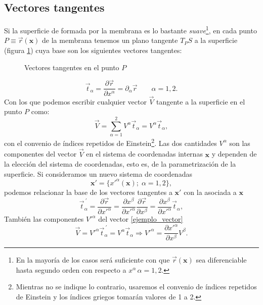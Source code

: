 \subsection{Vectores tangentes}

Si la superficie de formada por la membrana es lo bastante
\textit{suave}\footnote{En la mayoría de los casos será suficiente con que
 $\vec{r}(\mathbf{x})$ sea diferenciable hasta segundo orden con respecto a
 $x^{\alpha}\, \alpha=1,2$.}, en cada punto $P\equiv\vec{r}(\mathbf{x})$ de la
membrana tenemos un plano tangente $T_PS$ a la superficie (figura
\ref{vectores_tang-fig}) cuya base son los siguientes vectores tangentes:
\begin{figure}[h]
\centering
 
\caption{Vectores tangentes en el punto $P$}\label{vectores_tang-fig}
\end{figure}

\begin{equation*}
\vec{t}_{\alpha}=\frac{\partial \vec{r}}{\partial
  x^{\alpha}}=\partial_{\alpha}\vec{r} \qquad \alpha=1,2.
\end{equation*}
Con los que podemos escribir cualquier vector $\vec{V}$ tangente a la superficie en el punto $P$ como:
\begin{equation}\label{ejemplo_vector} 
  \vec{V}=\sum^2_{\alpha=1}V^{\alpha}\vec{t}_{\alpha}=V^{\alpha}\vec{t}_{\alpha},
\end{equation}
con el convenio de índices repetidos de Einstein\footnote{Mientras no se
  indique lo contrario, usaremos el convenio de índices repetidos de
  Einstein y los índices griegos tomarán valores de 1 a 2.}. Las dos cantidades
$V^{\alpha}$ son las componentes del vector $\vec{V}$ en el sistema de
coordenadas internas $\mathbf{x}$ y dependen de la elección del sistema de
coordenadas, esto es, de la parametrización de la superficie. Si consideramos
un nuevo sistema de coordenadas  
\begin{equation*}
 \mathbf{x}'=\{x'^{\alpha}(\mathbf{x});\; \alpha=1,2\},
\end{equation*}
podemos relacionar la base de los vectores tangentes a $\mathbf{x}'$ con la
asociada a $\mathbf{x}$
\begin{equation*}
\vec{t}_{\alpha}^{\ '}=\frac{\partial \vec{r}}{\partial x'^{\alpha}}=
\frac{\partial x^{\beta}}{\partial x'^{\alpha}}\frac{\partial \vec{r}}{\partial x^{\beta}}=\frac{\partial x^{\beta}}{\partial x'^{\alpha}}\vec{t}_{\alpha},
\end{equation*}
También las componentes $V'^{\alpha}$ del vector \eqref{ejemplo_vector}
\begin{equation*} 
  \vec{V}=V'^{\alpha}\vec{t}_{\alpha}^{\
    '}=V^{\alpha}\vec{t}_{\alpha}\Rightarrow V'^{\alpha}=\frac{\partial x'^{\alpha}}{\partial x^{\beta}}V^{\beta}.
\end{equation*}

